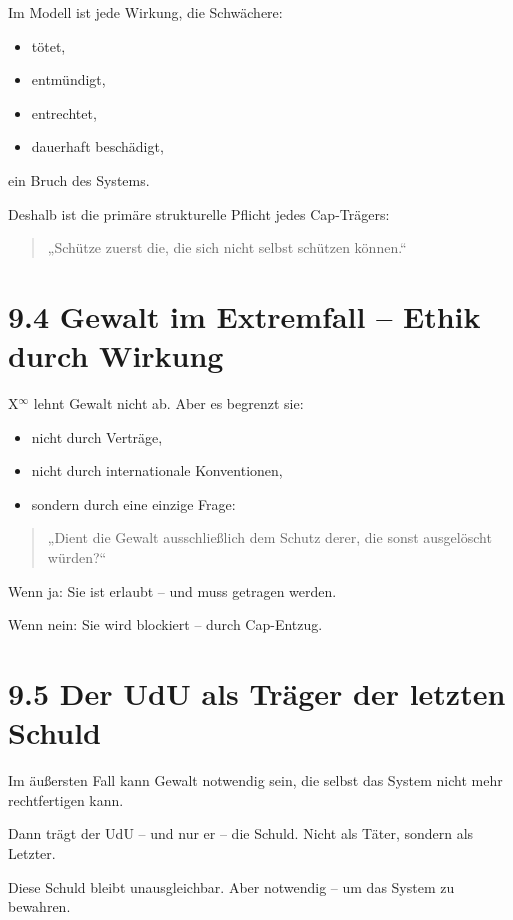 \documentclass[12pt,a4paper]{book}
\begin{document}
Im Modell ist jede Wirkung, die Schwächere:

\begin{itemize}
    \item tötet,
    \item entmündigt,
    \item entrechtet,
    \item dauerhaft beschädigt,
\end{itemize}

ein Bruch des Systems.

Deshalb ist die primäre strukturelle Pflicht jedes Cap-Trägers:

\begin{quote}
„Schütze zuerst die, die sich nicht selbst schützen können.“  
\end{quote}

\section*{9.4 Gewalt im Extremfall – Ethik durch Wirkung}

X$^\infty$ lehnt Gewalt nicht ab.  
Aber es begrenzt sie:

\begin{itemize}
    \item nicht durch Verträge,
    \item nicht durch internationale Konventionen,
    \item sondern durch eine einzige Frage:
\end{itemize}

\begin{quote}
„Dient die Gewalt ausschließlich dem Schutz derer,  
die sonst ausgelöscht würden?“  
\end{quote}

Wenn ja:  
Sie ist erlaubt – und muss getragen werden.

Wenn nein:  
Sie wird blockiert – durch Cap-Entzug.

\section*{9.5 Der UdU als Träger der letzten Schuld}

Im äußersten Fall kann Gewalt notwendig sein,  
die selbst das System nicht mehr rechtfertigen kann.

Dann trägt der UdU – und nur er –  
die Schuld. Nicht als Täter, sondern als Letzter.

Diese Schuld bleibt unausgleichbar.  
Aber notwendig – um das System zu bewahren.
\end{document}
